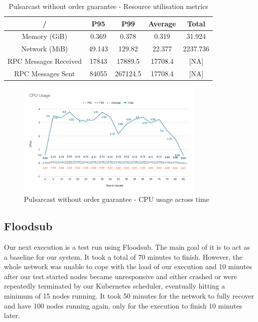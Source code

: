 \begin{table}[!htb]
\caption{Pulsarcast without order guarantee - Resource utilisation metrics}
\label{table:pulsarcast}
  \begin{center}
   \begin{tabular}{|c| c c c c|} 
   \hline
   / & P95 & P99 & Average & Total \\ [0.5ex] 
   \hline\hline
   Memory (GiB) & 0.369 & 0.378 & 0.319 & 31.924 \\
   \hline
   Network (MiB) & 49.143 & 129.82 & 22.377 & 2237.736 \\
   \hline
   RPC Messages Received & 17843 & 17889.5 & 17708.4 & [NA] \\
   \hline
   RPC Messages Sent & 84055 & 267124.5 & 17708.4 & [NA] \\ [1ex] 
   \hline
  \end{tabular}
  \end{center}
\end{table}

\begin{figure}[!htb]
  \centering
  \includegraphics[width=0.8\textwidth]{img/graph-pulsarcast-cpu.png}
  \caption{Pulsarcast without order guarantee - CPU usage across time}
  \label{fig:graph-pulsarcast-cpu}
\end{figure}

\subsection{Floodsub}\label{subsec:floodsub}

Our next execution is a test run using Floodsub. The main goal of it is to act
as a baseline for our system. It took a total of 70 minutes to finish. However,
the whole network was unable to cope with the load of our execution and 10
minutes after our test started nodes became unresponsive and either crashed or
were repeatedly terminated by our Kubernetes scheduler, eventually hitting a
minimum of 15 nodes running. It took 50 minutes for the network to fully
recover and have 100 nodes running again, only for the execution to finish 10
minutes later.

